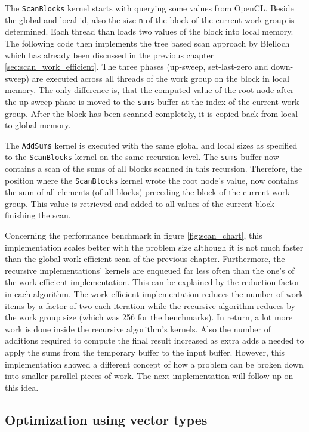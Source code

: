 The \lstinline!ScanBlocks! kernel starts with querying some values from OpenCL. Beside the global and local id, also the size \lstinline!n! of the block of the current work group is determined. Each thread than loads two values of the block into local memory. The following code then implements the tree based scan approach by Blelloch which has already been discussed in the previous chapter \ref{sec:scan_work_efficient}. The three phases (up-sweep, set-last-zero and down-sweep) are executed across all threads of the work group on the block in local memory. The only difference is, that the computed value of the root node after the up-sweep phase is moved to the \lstinline!sums! buffer at the index of the current work group. After the block has been scanned completely, it is copied back from local to global memory.

The \lstinline!AddSums! kernel is executed with the same global and local sizes as specified to the \lstinline!ScanBlocks! kernel on the same recursion level. The \lstinline!sums! buffer now contains a scan of the sums of all blocks scanned in this recursion. Therefore, the position where the \lstinline!ScanBlocks! kernel wrote the root node's value, now contains the sum of all elements (of all blocks) preceding the block of the current work group. This value is retrieved and added to all values of the current block finishing the scan.

Concerning the performance benchmark in figure \ref{fig:scan_chart}, this implementation scales better with the problem size although it is not much faster than the global work-efficient scan of the previous chapter. Furthermore, the recursive implementations' kernels are enqueued far less often than the one's of the work-efficient implementation. This can be explained by the reduction factor in each algorithm. The work efficient implementation reduces the number of work items by a factor of two each iteration while the recursive algorithm reduces by the work group size (which was 256 for the benchmarks). In return, a lot more work is done inside the recursive algorithm's kernels. Also the number of additions required to compute the final result increased as extra adds a needed to apply the sums from the temporary buffer to the input buffer.
However, this implementation showed a different concept of how a problem can be broken down into smaller parallel pieces of work. The next implementation will follow up on this idea.

\subsection{Optimization using vector types}



